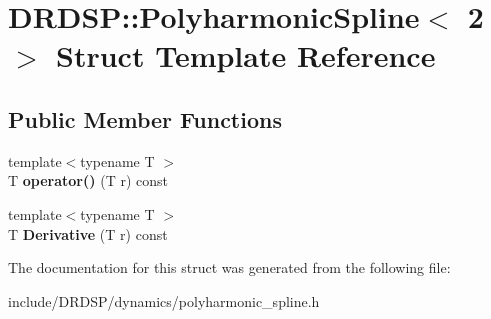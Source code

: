 \hypertarget{struct_d_r_d_s_p_1_1_polyharmonic_spline_3_012_01_4}{\section{D\-R\-D\-S\-P\-:\-:Polyharmonic\-Spline$<$ 2 $>$ Struct Template Reference}
\label{struct_d_r_d_s_p_1_1_polyharmonic_spline_3_012_01_4}
}
\subsection*{Public Member Functions}
\begin{DoxyCompactItemize}
\item 
\hypertarget{struct_d_r_d_s_p_1_1_polyharmonic_spline_3_012_01_4_ac1903e0b1c7b324e6a61bb1af88fbdf1}{{\footnotesize template$<$typename T $>$ }\\T {\bfseries operator()} (T r) const }\label{struct_d_r_d_s_p_1_1_polyharmonic_spline_3_012_01_4_ac1903e0b1c7b324e6a61bb1af88fbdf1}

\item 
\hypertarget{struct_d_r_d_s_p_1_1_polyharmonic_spline_3_012_01_4_a2d6b76df2c058819ea81984a953cba34}{{\footnotesize template$<$typename T $>$ }\\T {\bfseries Derivative} (T r) const }\label{struct_d_r_d_s_p_1_1_polyharmonic_spline_3_012_01_4_a2d6b76df2c058819ea81984a953cba34}

\end{DoxyCompactItemize}


The documentation for this struct was generated from the following file\-:\begin{DoxyCompactItemize}
\item 
include/\-D\-R\-D\-S\-P/dynamics/polyharmonic\-\_\-spline.\-h\end{DoxyCompactItemize}
